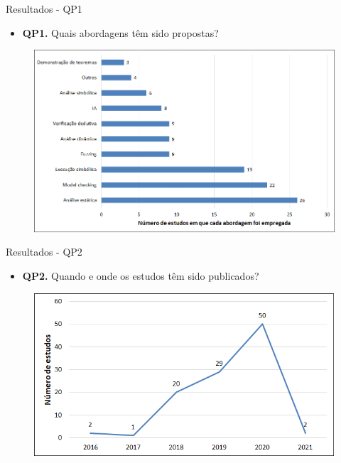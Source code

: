 \begin{frame}{Resultados - QP1}
    \begin{itemize}
        \item \textbf{QP1.} Quais abordagens têm sido propostas?
    \end{itemize}
    \begin{figure}[!htb]
     \centering
     \includegraphics[scale=0.4]{figuras/metodologia/rq1-abordagens.png}
    \end{figure}
\end{frame}

\begin{frame}{Resultados - QP2}
    \begin{itemize}
        \item \textbf{QP2.} Quando e onde os estudos têm sido publicados?
    \end{itemize}
    \begin{figure}[!htb]
     \centering
     \includegraphics[scale=0.5]{figuras/metodologia/rq2-distribuicao-estudos.png}
    \end{figure}
\end{frame}

